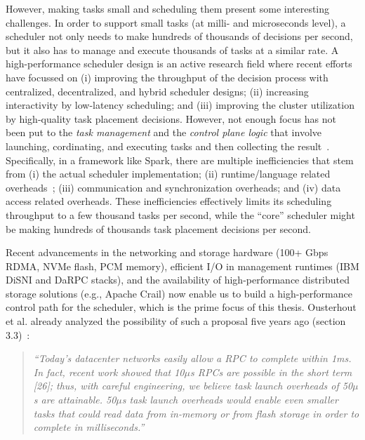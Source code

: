 \documentclass[10pt,a4paper]{article}
\begin{document}
However, making tasks small and scheduling them present some
interesting challenges.
In order to support small tasks (at milli- and microseconds level), a 
scheduler not only needs to make hundreds of thousands of 
decisions per second, but it also has to manage
and execute thousands of tasks at a similar rate. A high-performance
scheduler design is an active research field where recent
efforts~\cite{2015-sosp-sparrow,2015-eurosys-borg,2013-eurosys-omega,
2016-osdi-firm,2017-atc-lowlat}
have focussed on (i) improving the throughput of the decision process with
centralized, decentralized, and hybrid scheduler designs; (ii) increasing
interactivity by low-latency scheduling; and 
(iii) improving the cluster utilization by high-quality task placement
decisions.
However, not enough focus has not been put to the \textit{task management} 
and the \textit{control plane logic} that involve launching, cordinating,
and executing tasks and then collecting the result~\cite{2017-atc-nimbus}.
Specifically, in a framework like Spark, there are multiple inefficiencies that stem from 
(i) the actual scheduler implementation;  
(ii) runtime/language related overheads~\cite{2017-hotos-runtime}; 
(iii) communication and synchronization overheads; and  
(iv) data access related overheads. 
These inefficiencies effectively limits its scheduling throughput to a few 
thousand tasks per second, while the ``core'' scheduler might be making 
hundreds of thousands task placement decisions per second.     


Recent advancements in the networking and storage hardware (100+ Gbps
RDMA, NVMe flash, PCM memory), efficient I/O in management runtimes (IBM 
DiSNI and DaRPC stacks), and the availability of high-performance distributed
storage solutions (e.g., Apache Crail) now enable us to build a high-performance
control path for the scheduler, which is the prime focus of this thesis.
Ousterhout et al. already analyzed the possibility of such a proposal five 
years ago (section 3.3)~\cite{2013-hotos-tiny-tasks}: 

\begin{quote}
\textit{``Today’s datacenter networks easily allow a RPC to complete within 
1ms. In fact, recent work showed that 10$\mu$s RPCs are possible in the short 
term [26]; thus, with careful engineering, we believe task launch overheads 
of 50$\mu$s are attainable. 50$\mu$s task launch overheads would enable even
smaller tasks that could read data from in-memory or from flash storage
in order to complete in milliseconds.''}
\end{quote}
\end{document}
